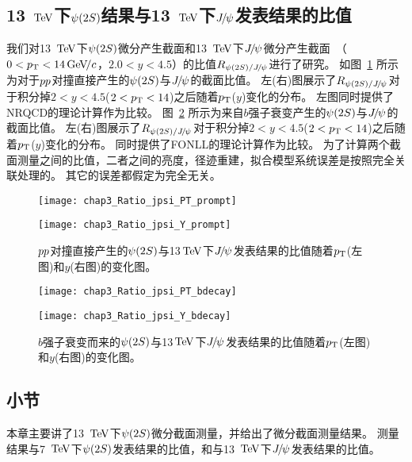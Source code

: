 \subsection{13 $\tev$下$\psitwos$结果与13 $\tev$下$\jpsi$发表结果的比值}
我们对13 $\tev$下$\psitwos$微分产生截面和13 $\tev$下$\jpsi$微分产生截面~\cite{LHCb-PAPER-2015-037}（$0<\pt<14\gevc$，$2.0<y<4.5$）的比值$\Rpsijpsi$进行了研究。
如图~\ref{fig:Ratio_jpsi_PT_prompt} 所示为对于$\pp$对撞直接产生的$\psitwos$与$\jpsi$的截面比值。
左(右)图展示了$\Rpsijpsi$对于积分掉$2<y<4.5$($2<\pt<14$)之后随着$\pt$($y$)变化的分布。
左图同时提供了NRQCD的理论计算作为比较。
图~\ref{fig:Ratio_jpsi_PT_bdecay} 所示为来自$b$强子衰变产生的$\psitwos$与$\jpsi$的截面比值。
左(右)图展示了$\Rpsijpsi$对于积分掉$2<y<4.5$($2<\pt<14$)之后随着$\pt$($y$)变化的分布。
同时提供了FONLL的理论计算作为比较。
为了计算两个截面测量之间的比值，二者之间的亮度，径迹重建，拟合模型系统误差是按照完全关联处理的。
其它的误差都假定为完全无关。

\begin{figure}[!tbp]
\centering
\begin{minipage}[t]{0.45\textwidth}
\centering
\texttt{[image: chap3\_Ratio\_jpsi\_PT\_prompt]}
\end{minipage}
\begin{minipage}[t]{0.45\textwidth}
\centering
\texttt{[image: chap3\_Ratio\_jpsi\_Y\_prompt]}
\end{minipage}
\caption{$\pp$对撞直接产生的$\psitwos$与13$\tev$下$\jpsi$发表结果的比值随着$\pt$(左图)和$y$(右图)的变化图。}
\label{fig:Ratio_jpsi_PT_prompt}
\end{figure}
\begin{figure}[!tbp]
\centering
\begin{minipage}[t]{0.45\textwidth}
\centering
\texttt{[image: chap3\_Ratio\_jpsi\_PT\_bdecay]}
\end{minipage}
\begin{minipage}[t]{0.45\textwidth}
\centering
\texttt{[image: chap3\_Ratio\_jpsi\_Y\_bdecay]}
\end{minipage}
\caption{$b$强子衰变而来的$\psitwos$与13$\tev$下$\jpsi$发表结果的比值随着$\pt$(左图)和$y$(右图)的变化图。}
\label{fig:Ratio_jpsi_PT_bdecay}
\end{figure}


\subsection{小节}
本章主要讲了13 $\tev$下$\psitwos$微分截面测量，并给出了微分截面测量结果。
测量结果与7 $\tev$下$\psitwos$发表结果的比值，和与13 $\tev$下$\jpsi$发表结果的比值。


